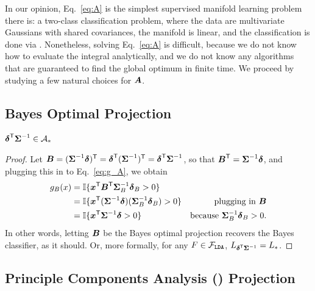 \documentclass[11pt]{extarticle}
\begin{document}
In our opinion, Eq.~\eqref{eq:A} is the simplest supervised manifold learning problem there is: a two-class classification problem, where the data are multivariate Gaussians with shared covariances, the manifold is linear, and the classification is done via \Lda.
Nonetheless, solving Eq.~\eqref{eq:A} is difficult, because we do not know how to evaluate the integral analytically, and we do not know any algorithms that are guaranteed to find the global optimum in finite time.
We proceed by studying a few natural choices for $\boldsymbol{A}$.





\subsection{Bayes Optimal Projection}

\begin{lem}
$\boldsymbol{\delta}^{\mathsf{T}}  \boldsymbol{\Sigma}^{-1} \in \mathcal{A}_*$
\end{lem}

\begin{proof}
Let $\boldsymbol{B} = (\boldsymbol{\Sigma}^{-1} \boldsymbol{\delta})^{\mathsf{T}} = \boldsymbol{\delta}^{\mathsf{T}} (\boldsymbol{\Sigma}^{-1})^{\mathsf{T}} = \boldsymbol{\delta}^{\mathsf{T}} \boldsymbol{\Sigma}^{-1}$, so that $\boldsymbol{B}^{\mathsf{T}} = \boldsymbol{\Sigma}^{-1} \boldsymbol{\delta}$,
and plugging this in to Eq.~\eqref{eq:g_A}, we obtain
\begin{align*}
g_{B}(x) &= \mathbb{I} \{ \boldsymbol{x}^{\mathsf{T}} \boldsymbol{B}^{\mathsf{T}}  \boldsymbol{\Sigma}^{-1}_{B} \boldsymbol{\delta}_{B} > 0\} &
\\&= \mathbb{I} \{ \boldsymbol{x}^{\mathsf{T}} (\boldsymbol{\Sigma}^{-1} \boldsymbol{\delta}) (\boldsymbol{\Sigma}^{-1}_{B} \boldsymbol{\delta}_{B}) > 0\} & \text{plugging in $\boldsymbol{B}$}
\\&= \mathbb{I} \{ \boldsymbol{x}^{\mathsf{T}} \boldsymbol{\Sigma}^{-1} \boldsymbol{\delta}  > 0\} & \text{because $\boldsymbol{\Sigma}^{-1}_{B} \boldsymbol{\delta}_{B} > 0$}.
\end{align*}
In other words, letting $\boldsymbol{B}$ be the Bayes optimal projection recovers the Bayes classifier, as it should.
Or, more formally, for any $F \in \mathcal{F}_{{\texttt{LDA}}}$, $L_{\boldsymbol{\delta}^{\mathsf{T}} \boldsymbol{\Sigma}^{-1}} = L_*$.
\end{proof}

\subsection[PCA]{Principle Components Analysis (\Pca) Projection}
\label{sec:pca}
\end{document}
